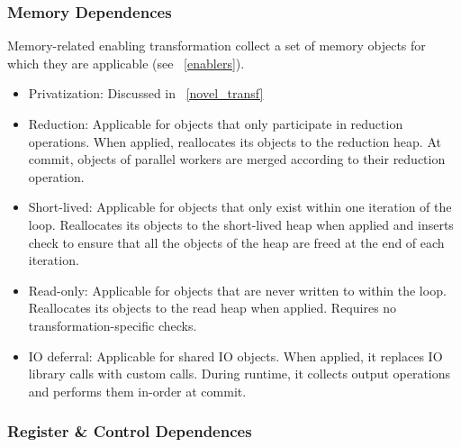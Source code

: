 
\subsubsection{Memory Dependences}

Memory-related enabling transformation collect a set of memory objects
for which they are applicable (see ~\cref{enablers}).


\begin{itemize}
%
\item Privatization: Discussed in ~\ref{novel_transf}

\item Reduction: Applicable for objects that only participate in
reduction operations. When applied, reallocates
its objects to the reduction heap. At commit, objects of parallel
workers are merged according to their reduction operation.




\item Short-lived: Applicable for objects that only exist within one
iteration of the loop. Reallocates its objects to the
short-lived heap when applied and inserts check to ensure that all
the objects of the heap are freed at the end of each iteration.

\item Read-only: Applicable for objects that are never written to within
the loop. Reallocates its objects to the read heap when applied. Requires no
transformation-specific checks.

\item IO deferral: Applicable for shared IO objects. When applied, it
replaces IO library calls with custom calls. During runtime, it
collects output operations and performs them in-order at commit.

\end{itemize}

\subsubsection{Register \& Control Dependences}

